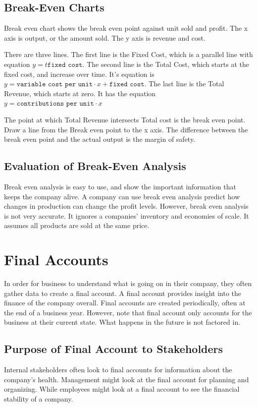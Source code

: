 \documentclass{standalone}
\begin{document}
\subsection{Break-Even Charts}
Break even chart shows the break even point against unit sold and profit.
The x axis is output, or the amount sold.
The y axis is revenue and cost.

There are three lines.
The first line is the Fixed Cost, which is a parallel line with equation $y=t\texttt{fixed cost}$.
The second line is the Total Cost, which starts at the fixed cost, and increase over time.
It's equation is $y = \texttt{variable cost per unit} \cdot x + \texttt{fixed cost}$.
The last line is the Total Revenue, which starts at zero.
It has the equation $y = \texttt{contributions per unit} \cdot x$

The point at which Total Revenue intersects Total cost is the break even point.
Draw a line from the Break even point to the x axis.
The difference between the break even point and the actual output is the margin of safety.

\subsection{Evaluation of Break-Even Analysis}
Break even analysis is easy to use, and show the important information that keeps the company alive.
A company can use break even analysis predict how changes in production can change the profit levels.
However, break even analysis is not very accurate. 
It ignores a companies' inventory and economies of scale. 
It assumes all products are sold at the same price.

\section{Final Accounts}
In order for business to understand what is going on in their company, they often gather data to create a final account.
A final account provides insight into the finance of the company overall.
Final accounts are created periodically, often at the end of a business year.
However, note that final account only accounts for the business at their current state. 
What happens in the future is not factored in.

\subsection{Purpose of Final Account to Stakeholders}
Internal stakeholders often look to final accounts for information about the company's health.
Management might look at the final account for planning and organizing.
While employees might look at a final account to see the financial stability of a company.
\end{document}
